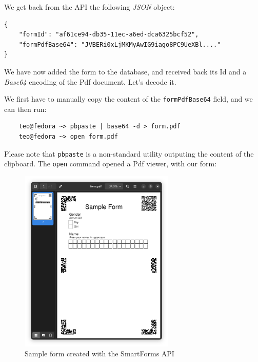 \documentclass[11pt, a4paper]{report}
\def\code#1{\texttt{#1}}
\begin{document}
We get back from the API the following \textit{JSON} object:
\begin{verbatim}
{
    "formId": "af61ce94-db35-11ec-a6ed-dca6325bcf52",
    "formPdfBase64": "JVBERi0xLjMKMyAwIG9iago8PC9UeXBl...."
}
\end{verbatim}

We have now added the form to the database, and received back its Id and a \textit{Base64} encoding of the Pdf document. Let's decode it.

We first have to manually copy the content of the \code{formPdfBase64} field, and we can then run:

\begin{verbatim}
    teo@fedora ~> pbpaste | base64 -d > form.pdf
    teo@fedora ~> open form.pdf
\end{verbatim}

Please note that \code{pbpaste} is a non-standard utility outputing the content of the clipboard. The \code{open} command opened a Pdf viewer, with our form:

\begin{figure}[!h]
    \centering
    \includegraphics[width=20em]{images/screenshoots/sample_form.png}
    \caption{Sample form created with the SmartForms API}
    \label{fig:label}
\end{figure}
\end{document}
